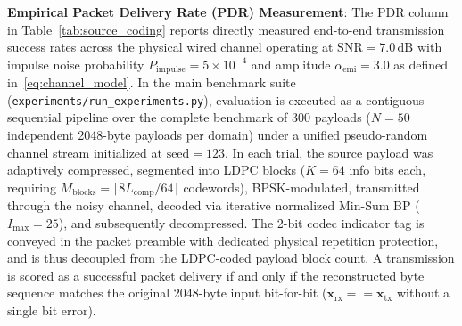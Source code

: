 \documentclass[conference]{IEEEtran}
\begin{document}
\textbf{Empirical Packet Delivery Rate (PDR) Measurement}: The PDR column in Table~\ref{tab:source_coding} reports directly measured end-to-end transmission success rates across the physical wired channel operating at $\text{SNR} = 7.0\,\text{dB}$ with impulse noise probability $P_{\text{impulse}} = 5 \times 10^{-4}$ and amplitude $\alpha_{\text{emi}} = 3.0$ as defined in~\eqref{eq:channel_model}. In the main benchmark suite (\texttt{experiments/\allowbreak run\_\allowbreak experiments.py}), evaluation is executed as a contiguous sequential pipeline over the complete benchmark of $300$ payloads ($N = 50$ independent 2048-byte payloads per domain) under a unified pseudo-random channel stream initialized at $\text{seed} = 123$. In each trial, the source payload was adaptively compressed, segmented into LDPC blocks ($K=64$ info bits each, requiring $M_{\text{blocks}} = \lceil 8 L_{\text{comp}} / 64 \rceil$ codewords), BPSK-modulated, transmitted through the noisy channel, decoded via iterative normalized Min-Sum BP ($I_{\max} = 25$), and subsequently decompressed. The 2-bit codec indicator tag is conveyed in the packet preamble with dedicated physical repetition protection, and is thus decoupled from the LDPC-coded payload block count. A transmission is scored as a successful packet delivery if and only if the reconstructed byte sequence matches the original 2048-byte input bit-for-bit ($\mathbf{x}_{\text{rx}} == \mathbf{x}_{\text{tx}}$ without a single bit error).
\end{document}
